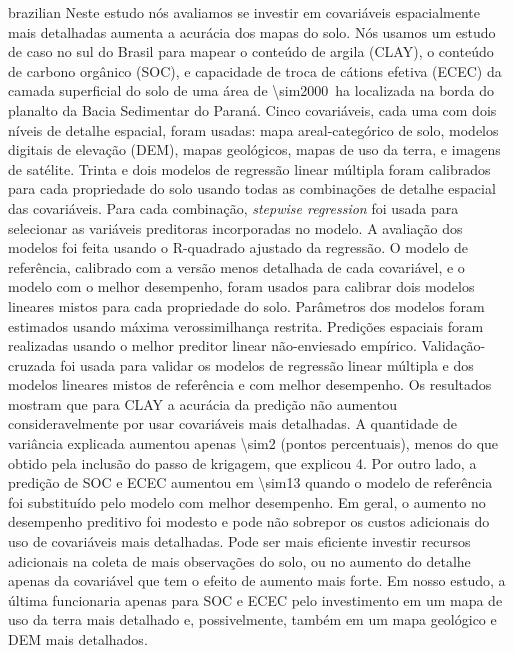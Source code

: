 \begin{chapterabstract}{brazilian}{\portuguesekeys}
Neste estudo nós avaliamos se investir em covariáveis espacialmente mais detalhadas aumenta a acurácia dos 
mapas do solo. Nós usamos um estudo de caso no sul do Brasil para mapear o conteúdo de argila (CLAY), o 
conteúdo de carbono orgânico (SOC), e capacidade de troca de cátions efetiva (ECEC) da camada superficial do 
solo de uma área de \SI{\sim2000}{\hectare} localizada na borda do planalto da Bacia Sedimentar do Paraná. 
Cinco covariáveis, cada uma com dois níveis de detalhe espacial, foram usadas: mapa areal-categórico de solo,
modelos digitais de elevação (DEM), mapas geológicos, mapas de uso da terra, e imagens de satélite. Trinta e 
dois modelos de regressão linear múltipla foram calibrados para cada propriedade do solo usando todas as 
combinações de detalhe espacial das covariáveis. Para cada combinação, \textit{stepwise regression} foi usada 
para selecionar as variáveis preditoras incorporadas no modelo. A avaliação dos modelos foi feita usando o 
R-quadrado ajustado da regressão. O modelo de referência, calibrado com a versão menos detalhada de cada 
covariável, e o modelo com o melhor desempenho, foram usados para calibrar dois modelos lineares mistos para
cada propriedade do solo. Parâmetros dos modelos foram estimados usando máxima verossimilhança restrita. 
Predições espaciais foram realizadas usando o melhor preditor linear não-enviesado empírico. Validação-cruzada 
foi usada para validar os modelos de regressão linear múltipla e dos modelos lineares mistos de referência e 
com melhor desempenho. Os resultados mostram que para CLAY a acurácia da predição não aumentou 
consideravelmente por usar covariáveis mais detalhadas. A quantidade de variância explicada aumentou apenas 
\SI{\sim2}{\pp} (pontos percentuais), menos do que obtido pela inclusão do passo de krigagem, que explicou 
\SI{4}{\pp}. Por outro lado, a predição de SOC e ECEC aumentou em \SI{\sim13}{\pp} quando o modelo de 
referência foi substituído pelo modelo com melhor desempenho. Em geral, o aumento no desempenho preditivo foi 
modesto e pode não sobrepor os custos adicionais do uso de covariáveis mais detalhadas. Pode ser mais eficiente
investir recursos adicionais na coleta de mais observações do solo, ou no aumento do detalhe apenas da 
covariável que tem o efeito de aumento mais forte. Em nosso estudo, a última funcionaria apenas para SOC e 
ECEC pelo investimento em um mapa de uso da terra mais detalhado e, possivelmente, também em um mapa 
geológico e DEM mais detalhados.
\end{chapterabstract}

